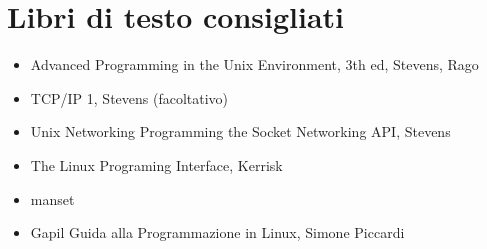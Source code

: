 \newpage
\section{Libri di testo consigliati}
\begin{itemize}
	\item Advanced Programming in the Unix Environment, 3th ed, Stevens, Rago
	\item TCP/IP 1, Stevens (facoltativo)
	\item Unix Networking Programming the Socket Networking API, Stevens
	\item The Linux Programing Interface, Kerrisk
	\item manset
	\item Gapil Guida alla Programmazione in Linux, Simone Piccardi
\end{itemize}